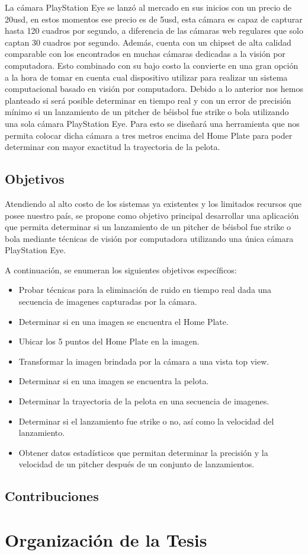 La cámara PlayStation Eye se lanzó al mercado en sus inicios con un precio de
20usd, en estos momentos ese precio es de 5usd, esta cámara es capaz de
capturar hasta 120 cuadros por segundo, a diferencia de las cámaras web
regulares que solo captan 30 cuadros por segundo. Además, cuenta con un
chipset de alta calidad comparable con los encontrados en muchas cámaras
dedicadas a la visión por computadora. Esto combinado con su bajo costo la
convierte en una gran opción a la hora de tomar en cuenta cual dispositivo utilizar
para realizar un sistema computacional basado en visión por computadora.
Debido a lo anterior nos hemos planteado si será posible determinar en tiempo
real y con un error de precisión mínimo si un lanzamiento de un pitcher de béisbol
fue strike o bola utilizando una sola cámara PlayStation Eye. Para esto se diseñará
una herramienta que nos permita colocar dicha cámara a tres metros encima del
Home Plate para poder determinar con mayor exactitud la trayectoria de la pelota.

\subsection*{Objetivos}

Atendiendo al alto costo de los sistemas ya existentes y los limitados recursos que
posee nuestro país, se propone como objetivo principal desarrollar una aplicación
que permita determinar si un lanzamiento de un pitcher de béisbol
fue strike o bola mediante técnicas de visión por computadora utilizando una única
cámara PlayStation Eye.

A continuación, se enumeran los siguientes objetivos específicos:
\begin{itemize}
    \item {Probar técnicas para la eliminación de ruido en tiempo real dada una secuencia de
            imagenes capturadas por la cámara.}
    \item {Determinar si en una imagen se encuentra el Home Plate.}
    \item {Ubicar los 5 puntos del Home Plate en la imagen.}
    \item {Transformar la imagen brindada por la cámara a una vista top view.}
    \item {Determinar si en una imagen se encuentra la pelota.}
    \item {Determinar la trayectoria de la pelota en una secuencia de imagenes.}
    \item {Determinar si el lanzamiento fue strike o no, así como la velocidad del lanzamiento.}
    \item {Obtener datos estadísticos que permitan determinar la precisión y la
            velocidad de un pitcher después de un conjunto de lanzamientos.}
\end{itemize}

\subsection*{Contribuciones}

\section*{Organización de la Tesis}


